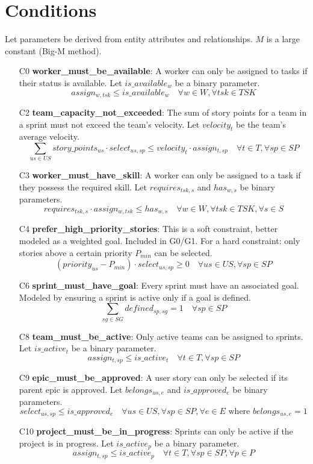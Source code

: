 \documentclass[11pt]{article}
\begin{document}
\section{Conditions}
\label{sec:conditions}
Let parameters be derived from entity attributes and relationships. $M$ is a large constant (Big-M method).
\begin{itemize}
    \item[C0] \textbf{worker\_must\_be\_available}: A worker can only be assigned to tasks if their status is available. Let $is\_available_w$ be a binary parameter.
    $$ assign_{w,tsk} \le is\_available_w \quad \forall w \in W, \forall tsk \in TSK $$
    \item[C2] \textbf{team\_capacity\_not\_exceeded}: The sum of story points for a team in a sprint must not exceed the team's velocity. Let $velocity_t$ be the team's average velocity.
    $$ \sum_{us \in US} story\_points_{us} \cdot select_{us,sp} \le velocity_t \cdot assign_{t,sp} \quad \forall t \in T, \forall sp \in SP $$
    \item[C3] \textbf{worker\_must\_have\_skill}: A worker can only be assigned to a task if they possess the required skill. Let $requires_{tsk,s}$ and $has_{w,s}$ be binary parameters.
    $$ requires_{tsk,s} \cdot assign_{w,tsk} \le has_{w,s} \quad \forall w \in W, \forall tsk \in TSK, \forall s \in S $$
    \item[C4] \textbf{prefer\_high\_priority\_stories}: This is a soft constraint, better modeled as a weighted goal. Included in G0/G1. For a hard constraint: only stories above a certain priority $P_{min}$ can be selected.
    $$ (priority_{us} - P_{min}) \cdot select_{us,sp} \ge 0 \quad \forall us \in US, \forall sp \in SP $$
    \item[C6] \textbf{sprint\_must\_have\_goal}: Every sprint must have an associated goal. Modeled by ensuring a sprint is active only if a goal is defined.
    $$ \sum_{sg \in SG} defined_{sp,sg} = 1 \quad \forall sp \in SP $$
    \item[C8] \textbf{team\_must\_be\_active}: Only active teams can be assigned to sprints. Let $is\_active_t$ be a binary parameter.
    $$ assign_{t,sp} \le is\_active_t \quad \forall t \in T, \forall sp \in SP $$
    \item[C9] \textbf{epic\_must\_be\_approved}: A user story can only be selected if its parent epic is approved. Let $belongs_{us,e}$ and $is\_approved_e$ be binary parameters.
    $$ select_{us,sp} \le is\_approved_e \quad \forall us \in US, \forall sp \in SP, \forall e \in E \text{ where } belongs_{us,e}=1 $$
    \item[C10] \textbf{project\_must\_be\_in\_progress}: Sprints can only be active if the project is in progress. Let $is\_active_p$ be a binary parameter.
    $$ assign_{t,sp} \le is\_active_p \quad \forall t \in T, \forall sp \in SP, \forall p \in P $$
    
\end{itemize}
\end{document}
